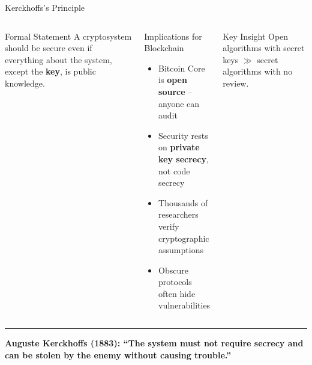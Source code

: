 \documentclass[8pt,aspectratio=169]{beamer}
\newcommand{\bottomnote}[1]{\vfill\vspace{-2mm}\textcolor{mllavender2}{\rule{\textwidth}{0.4pt}}\vspace{1mm}\footnotesize\textbf{#1}}
\begin{document}
\begin{frame}{Kerckhoffs's Principle}
\begin{columns}
\begin{block}{Formal Statement}
\small A cryptosystem should be secure even if everything about the system, except the \textbf{key}, is public knowledge.
\end{block}
\vspace{2mm}
\begin{block}{Implications for Blockchain}
\begin{itemize}\small
  \item Bitcoin Core is \textbf{open source} -- anyone can audit
  \item Security rests on \textbf{private key secrecy}, not code secrecy
  \item Thousands of researchers verify cryptographic assumptions
  \item Obscure protocols often hide vulnerabilities
\end{itemize}
\end{block}
\begin{alertblock}{Key Insight}
\small Open algorithms with secret keys $\gg$ secret algorithms with no review.
\end{alertblock}
\end{columns}
\bottomnote{Auguste Kerckhoffs (1883): ``The system must not require secrecy and can be stolen by the enemy without causing trouble.''}
\end{frame}
\end{document}
